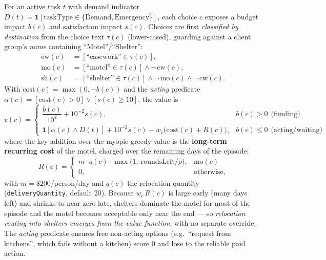 \documentclass[11pt]{article}
\newcommand{\code}[1]{{\texttt{\small #1}}}
\begin{document}
For an active task $t$ with demand indicator $D(t)=\mathbf{1}[\text{taskType}\in\{\text{Demand},\text{Emergency}\}]$,
each choice $c$ exposes a budget impact $b(c)$ and satisfaction impact $s(c)$. Choices are first
\emph{classified by destination} from the choice text $\tau(c)$ (lower-cased), guarding against a
client group's \emph{name} containing ``Motel''/``Shelter'':
\begin{align}
\text{cw}(c) &= [\text{``casework''} \in \tau(c)], \\
\text{mo}(c) &= [\text{``motel''} \in \tau(c)] \wedge \neg\,\text{cw}(c), \\
\text{sh}(c) &= [\text{``shelter''} \in \tau(c)] \wedge \neg\,\text{mo}(c) \wedge \neg\,\text{cw}(c).
\end{align}
With $\mathrm{cost}(c)=\max(0,-b(c))$ and the \emph{acting} predicate
$\alpha(c) = [\mathrm{cost}(c)>0] \vee [s(c)\ge 10]$, the value is
\begin{equation}
v(c) =
\begin{cases}
\dfrac{b(c)}{10^4} + 10^{-2} s(c), & b(c) > 0\ \ \text{(funding)}\\[10pt]
\mathbf{1}[\alpha(c)\wedge D(t)] + 10^{-2}s(c) - w_c\big(\mathrm{cost}(c) + R(c)\big), & b(c) \le 0\ \ \text{(acting/waiting)}
\end{cases}
\label{eq:v2val}
\end{equation}
where the key addition over the myopic greedy value is the \textbf{long-term recurring cost} of the
motel, charged over the remaining days of the episode:
\begin{equation}
R(c) = \begin{cases} m \cdot q(c) \cdot \max\!\big(1,\ \text{roundsLeft}/\rho\big), & \text{mo}(c)\\[4pt] 0, & \text{otherwise,}\end{cases}
\end{equation}
with $m = \$200$/person/day and $q(c)$ the relocation quantity (\code{deliveryQuantity}, default $20$).
Because $w_c\,R(c)$ is large early (many days left) and shrinks to near zero late, shelters
dominate the motel for most of the episode and the motel becomes acceptable only near the end ---
so \emph{relocation routing into shelters emerges from the value function}, with no separate
override. The \emph{acting} predicate ensures free non-acting options (e.g.\ ``request from
kitchens'', which fails without a kitchen) score $0$ and lose to the reliable paid action.
\end{document}
